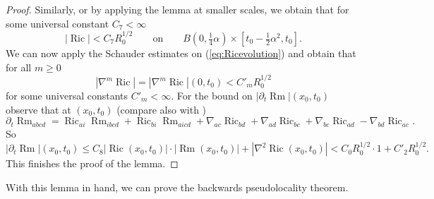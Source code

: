 \documentclass[11pt]{amsart}
\numberwithin{equation}{section}
\DeclareMathOperator{\Ric}{Ric}
\DeclareMathOperator{\Rm}{Rm}
\numberwithin{equation}{section}
\begin{document}
\begin{proof}
Similarly, or by applying the lemma at smaller scales, we obtain that for some universal constant $C_7 < \infty$
\[ |{\Ric}| < C_7 R_0^{1/2} \qquad \text{on} \qquad B(0,\tfrac14 \alpha) \times [t_0 - \tfrac12 \alpha^2, t_0]. \]
We can now apply the Schauder estimates on (\ref{eq:Ricevolution}) and obtain that for all $m \geq 0$
\[ |\nabla^m {\Ric}|  = |{\nabla^m \Ric}|(0, t_0)  < C'_m R_0^{1/2} \]
for some universal constants $C'_m < \infty$.
For the bound on $|\partial_t \Rm|(x_0, t_0)$ observe that at $(x_0, t_0)$ (compare also with \cite[Lemma 7.2]{Ha:0})
\[ \partial_t \Rm_{abcd} = \Ric_{ai} \Rm_{ibcd} + \Ric_{bi} \Rm_{aicd} 
+ \nabla_{ac} \Ric_{bd} + \nabla_{ad} \Ric_{bc} + \nabla_{bc} \Ric_{ad} - \nabla_{bd} \Ric_{ac}.  \]
So
\[ | {\partial_t \Rm} |(x_0, t_0) \leq C_8 |{\Ric (x_0, t_0)}| \cdot |{\Rm (x_0, t_0)}| + |{\nabla^2 \Ric (x_0,t_0)}| < C_0 R_0^{1/2} \cdot 1 + C'_2 R_0^{1/2}. \]
This finishes the proof of the lemma.
\end{proof} 

With this lemma in hand, we can prove the backwards pseudolocality theorem.
\end{document}
